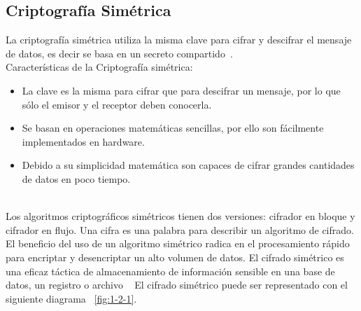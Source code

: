 \subsection{Criptografía Simétrica}
La criptografía simétrica utiliza la misma clave para cifrar y descifrar el mensaje de datos, es decir se basa en un secreto compartido~\cite{criptosimetrica}. \\ Características de la Criptografía simétrica: \begin{itemize}
	\item La clave es la misma para cifrar que para descifrar un mensaje, por lo que sólo el emisor y el receptor deben conocerla.
	\item Se basan en operaciones matemáticas sencillas, por ello son fácilmente implementados en hardware.
	\item Debido a su simplicidad matemática son capaces de cifrar grandes cantidades de datos en poco tiempo.
			       \end{itemize} ~\cite{sime} \\
Los algoritmos criptográficos simétricos tienen dos versiones: cifrador en bloque y cifrador en flujo. Una cifra es una palabra para describir un algoritmo de cifrado. El beneficio del uso de un algoritmo simétrico radica en el procesamiento rápido
para encriptar y desencriptar un alto volumen de datos. El cifrado simétrico es una eficaz táctica de almacenamiento de información
sensible en una base de datos, un registro o archivo ~\cite{sime} El cifrado simétrico puede ser representado con el siguiente diagrama ~\ref{fig:1-2-1}.

